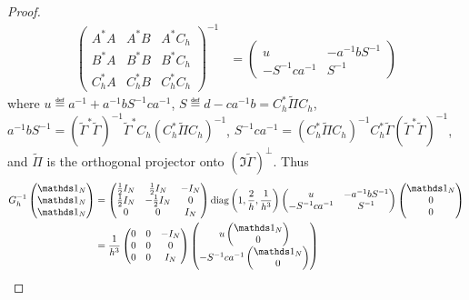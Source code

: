\begin{proof}
\begin{align*}
  \begin{pmatrix} A^*A & A^*B & A^*C_h\\ B^*A & B^*B& B^*C_h\\ C_h^*A & C_h^*B & C_h^*C_h\end{pmatrix}^{-1}
 &= \begin{pmatrix}
    u & -a^{-1}bS^{-1}\\
    -S^{-1}ca^{-1} & S^{-1}\end{pmatrix}
\end{align*}
where $u \eqdef a^{-1} + a^{-1}bS^{-1}ca^{-1}$, $S \eqdef d-ca^{-1}b=C_h^*\tilde{\Pi} C_h$, $a^{-1}bS^{-1} = (\tilde{\Gamma}^*\tilde{\Gamma})^{-1} \tilde{\Gamma}^*C_h(C_h^*\tilde{\Pi} C_h)^{-1}$, $S^{-1}ca^{-1}=(C_h^*\tilde{\Pi} C_h)^{-1} C_h^*\tilde{\Gamma}(\tilde{\Gamma}^*\tilde{\Gamma})^{-1}$, and $\tilde{\Pi}$ is the orthogonal projector onto $(\Im \tilde{\Gamma})^\perp$.
Thus 
\begin{align*}
  G_h^{-1}\begin{pmatrix}\bun_N\\\bun_N\\\bun_N\end{pmatrix} &= \begin{pmatrix}\frac{1}{2} I_N & \frac{1}{2} I_N & -I_N\\ \frac{1}{2}I_N &-\frac{1}{2} I_N & 0\\ 0 & 0 &I_N  \end{pmatrix}
\diag\left(1,\frac{2}{h},\frac{1}{h^3}\right)
\begin{pmatrix}
    u & -a^{-1}bS^{-1}\\
    -S^{-1}ca^{-1} & S^{-1}\end{pmatrix}
\begin{pmatrix} \bun_N\\0\\0\end{pmatrix}\\
&=\frac{1}{h^3} \begin{pmatrix}0 & 0 & -I_N\\ 0&0& 0\\ 0 & 0 &I_N  \end{pmatrix}
\begin{pmatrix}
   u \begin{pmatrix} \bun_N\\0\end{pmatrix} \\ 
   -S^{-1}ca^{-1}\begin{pmatrix} \bun_N\\0\end{pmatrix}

\end{pmatrix}
\end{align*}
\end{proof}
